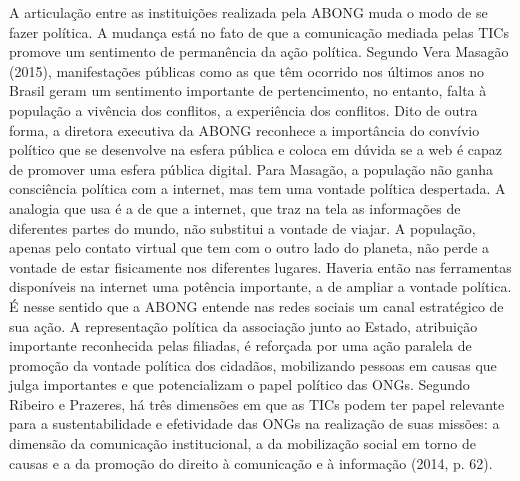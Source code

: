 A articulação entre as instituições realizada pela ABONG muda o modo de
se fazer política. A mudança está no fato de que a comunicação mediada
pelas TICs promove um sentimento de permanência da ação política.
Segundo Vera Masagão (2015), manifestações públicas como as que têm
ocorrido nos últimos anos no Brasil geram um sentimento importante de
pertencimento, no entanto, falta à população a vivência dos conflitos, a
experiência dos conflitos. Dito de outra forma, a diretora executiva da
ABONG reconhece a importância do convívio político que se desenvolve na
esfera pública e coloca em dúvida se a web é capaz de promover uma
esfera pública digital. Para Masagão, a população não ganha consciência
política com a internet, mas tem uma vontade política despertada. A
analogia que usa é a de que a internet, que traz na tela as informações
de diferentes partes do mundo, não substitui a vontade de viajar. A
população, apenas pelo contato virtual que tem com o outro lado do
planeta, não perde a vontade de estar fisicamente nos diferentes
lugares. Haveria então nas ferramentas disponíveis na internet uma
potência importante, a de ampliar a vontade política. É nesse sentido
que a ABONG entende nas redes sociais um canal estratégico de sua ação.
A representação política da associação junto ao Estado, atribuição
importante reconhecida pelas filiadas, é reforçada por uma ação paralela
de promoção da vontade política dos cidadãos, mobilizando pessoas em
causas que julga importantes e que potencializam o papel político das
ONGs. Segundo Ribeiro e Prazeres, há três dimensões em que as TICs podem
ter papel relevante para a sustentabilidade e efetividade das ONGs na
realização de suas missões: a dimensão da comunicação institucional, a
da mobilização social em torno de causas e a da promoção do direito à
comunicação e à informação (2014, p. 62).


